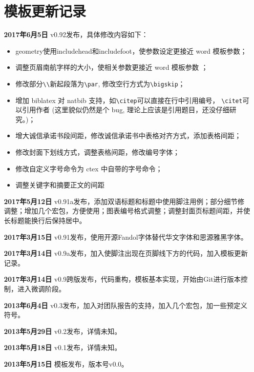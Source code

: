 \chapter{模板更新记录}
\label{chap:updatelog}
\textbf{2017年6月5日} v0.92发布，具体修改内容如下：
\begin{itemize}
  \item geometry使用includehead和includefoot，使参数设定更接近 word 模板参数；
  \item 调整页眉南航字样的大小，使相关参数更接近 word 模板参数 ；
  \item 修改部分\verb!\\!新起段落为\verb!\par!, 修改空行方式为\verb!\bigskip!；
  \item 增加 biblatex 对 natbib 支持，如\verb!\citep!可以直接在行中引用编号， \verb!\citet!可以引用作者 (这里貌似仍然是个 bug, 理论上应该是引用题目，还没仔细研究。)；
  \item 增大诚信承诺书段间距，修改诚信承诺书中表格对齐方式，添加表格间距；
  \item 修改封面下划线方式，调整表格间距，修改编号字体；
  \item 修改自定义字号命令为 ctex 中自带的字号命令；
  \item 调整关键字和摘要正文的间距
\end{itemize}

\textbf{2017年5月12日} v0.91a发布，添加双语标题和标题中使用脚注用例；部分细节修调整；增加几个宏包，方便使用；图表编号格式调整；调整封面页标题间距，并使长标题能换行后保持居中。

\textbf{2017年3月15日} v0.91发布，使用开源Fandol字体替代华文字体和思源雅黑字体。

\textbf{2017年3月14日} v0.9a发布，加入使脚注出现在页脚线下方的代码，加入模板更新记录。

\textbf{2017年3月14日} v0.9跨版发布，代码重构，模板基本实现，开始由Git进行版本控制，进入微调阶段。

\textbf{2013年6月4日} v0.3发布，加入对团队报告的支持，加入几个宏包，加一些预定义符号。

\textbf{2013年5月29日} v0.2发布，详情未知。

\textbf{2013年5月18日} v0.1发布，详情未知。

\textbf{2013年5月15日} 模板发布，版本号v0.0。
